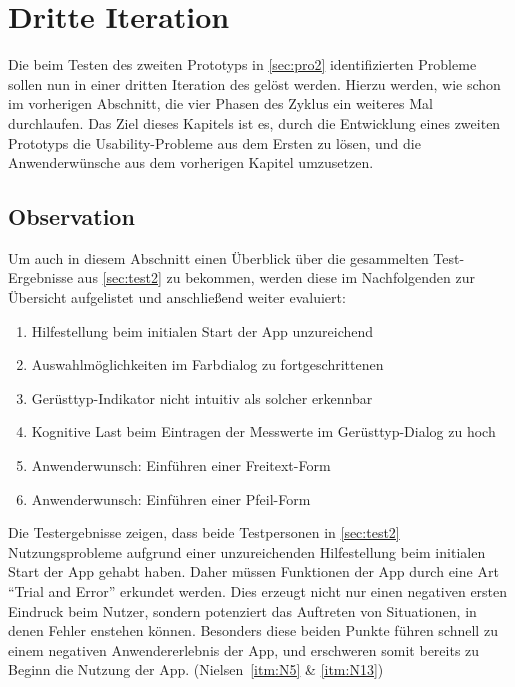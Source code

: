\chapter{Dritte Iteration}\label{chap:pro3}
Die beim Testen des zweiten Prototyps in \autoref{sec:pro2} identifizierten Probleme sollen nun in einer dritten Iteration des \hcdp{} gelöst werden.
Hierzu werden, wie schon im vorherigen Abschnitt, die vier Phasen des Zyklus ein weiteres Mal durchlaufen.
Das Ziel dieses Kapitels ist es, durch die Entwicklung eines zweiten Prototyps die Usability-Probleme aus dem Ersten zu lösen, und die Anwenderwünsche aus dem vorherigen Kapitel umzusetzen.

\section{Observation}\label{sec:obs3}
Um auch in diesem Abschnitt einen Überblick über die gesammelten Test-Ergebnisse aus \autoref{sec:test2} zu bekommen, werden diese im Nachfolgenden zur Übersicht aufgelistet und anschließend weiter evaluiert:

\begin{enumerate}
  \item Hilfestellung beim initialen Start der App unzureichend
  \item Auswahlmöglichkeiten im Farbdialog zu fortgeschrittenen
  \item Gerüsttyp-Indikator nicht intuitiv als solcher erkennbar
  \item Kognitive Last beim Eintragen der Messwerte im Gerüsttyp-Dialog zu hoch
  \item Anwenderwunsch: Einführen einer Freitext-Form
  \item Anwenderwunsch: Einführen einer Pfeil-Form 
\end{enumerate}

\noindent
Die Testergebnisse zeigen, dass beide Testpersonen in \autoref{sec:test2} Nutzungsprobleme aufgrund einer unzureichenden Hilfestellung beim initialen Start der App gehabt haben.
Daher müssen Funktionen der App durch eine Art ``Trial and Error'' erkundet werden.
Dies erzeugt nicht nur einen negativen ersten Eindruck beim Nutzer, sondern potenziert das Auftreten von Situationen, in denen Fehler enstehen können.
Besonders diese beiden Punkte führen schnell zu einem negativen Anwendererlebnis der App, und erschweren somit bereits zu Beginn die Nutzung der App.
(Nielsen~\autoref{itm:N5} \& \autoref{itm:N13}) \\

